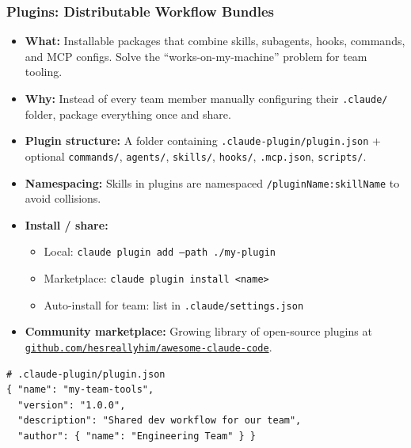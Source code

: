 \begin{frame}[fragile]\frametitle{Plugins: Distributable Workflow Bundles}
  \begin{itemize}
    \item \textbf{What:} Installable packages that combine skills, subagents, hooks, commands, and MCP configs. Solve the ``works-on-my-machine'' problem for team tooling.
    \item \textbf{Why:} Instead of every team member manually configuring their \texttt{.claude/} folder, package everything once and share.
    \item \textbf{Plugin structure:} A folder containing \texttt{.claude-plugin/plugin.json} + optional \texttt{commands/}, \texttt{agents/}, \texttt{skills/}, \texttt{hooks/}, \texttt{.mcp.json}, \texttt{scripts/}.
    \item \textbf{Namespacing:} Skills in plugins are namespaced \texttt{/pluginName:skillName} to avoid collisions.
    \item \textbf{Install / share:}
      \begin{itemize}
        \item Local: \texttt{claude plugin add --path ./my-plugin}
        \item Marketplace: \texttt{claude plugin install <name>}
        \item Auto-install for team: list in \texttt{.claude/settings.json}
      \end{itemize}
    \item \textbf{Community marketplace:} Growing library of open-source plugins at \href{https://github.com/hesreallyhim/awesome-claude-code}{\texttt{github.com/hesreallyhim/awesome-claude-code}}.
  \end{itemize}

\begin{lstlisting}
# .claude-plugin/plugin.json
{ "name": "my-team-tools",
  "version": "1.0.0",
  "description": "Shared dev workflow for our team",
  "author": { "name": "Engineering Team" } }
\end{lstlisting}
\end{frame}


